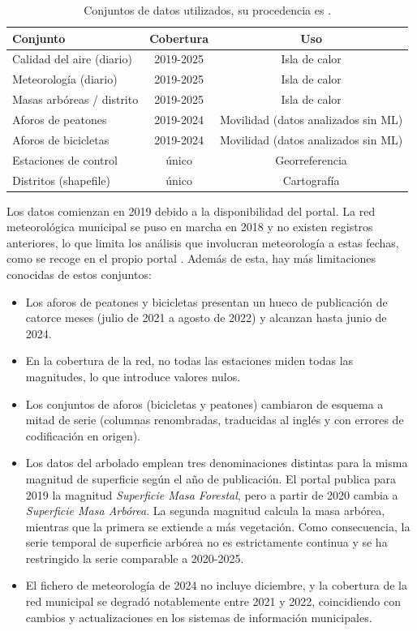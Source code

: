 \begin{table}[h]
	\centering
	\small
	\begin{tabular}{lcc}
		\hline
		\textbf{Conjunto} & \textbf{Cobertura} & \textbf{Uso} \\
		\hline
		Calidad del aire (diario) & 2019-2025 & Isla de calor \\
		Meteorología (diario) & 2019-2025 & Isla de calor \\
		Masas arbóreas / distrito & 2019-2025 & Isla de calor  \\
		Aforos de peatones & 2019-2024 & Movilidad (datos analizados sin ML) \\
		Aforos de bicicletas & 2019-2024 & Movilidad (datos analizados sin ML) \\
		Estaciones de control & único & Georreferencia \\
		Distritos (shapefile) & único & Cartografía \\
		\hline
	\end{tabular}
	\caption{Conjuntos de datos utilizados, su procedencia es \citep{AytoMadrid2025PortalDatos}.}
	\label{tab:conjuntos}
\end{table}

Los datos comienzan en 2019 debido a la disponibilidad del portal. La red meteorológica municipal se puso en marcha en 2018 y no existen registros anteriores, lo que limita los análisis que involucran meteorología a estas fechas, como se recoge en el propio portal \citep{AytoMadrid2025Interprete}. Además de esta, hay más limitaciones conocidas de estos conjuntos:
\begin{itemize}
	\item Los aforos de peatones y bicicletas presentan un hueco de publicación de catorce meses (julio de 2021 a agosto de 2022) y alcanzan hasta junio de 2024.
	\item En la cobertura de la red, no todas las estaciones miden todas las magnitudes, lo que introduce valores nulos.
	\item Los conjuntos de aforos (bicicletas y peatones) cambiaron de esquema a mitad de serie (columnas renombradas, traducidas al inglés y con errores de codificación en origen).
	\item Los datos del arbolado emplean tres denominaciones distintas para la misma magnitud de superficie según el año de publicación. El portal publica para 2019 la magnitud \emph{Superficie Masa Forestal}, pero a partir de 2020 cambia a \emph{Superficie Masa Arbórea}. La segunda magnitud calcula la masa arbórea, mientras que la primera se extiende a más vegetación. Como consecuencia, la serie temporal de superficie arbórea no es estrictamente continua y se ha restringido la serie comparable a 2020-2025.
	\item El fichero de meteorología de 2024 no incluye diciembre, y la cobertura de la red municipal se degradó notablemente entre 2021 y 2022, coincidiendo con cambios y actualizaciones en los sistemas de información municipales.
\end{itemize}


